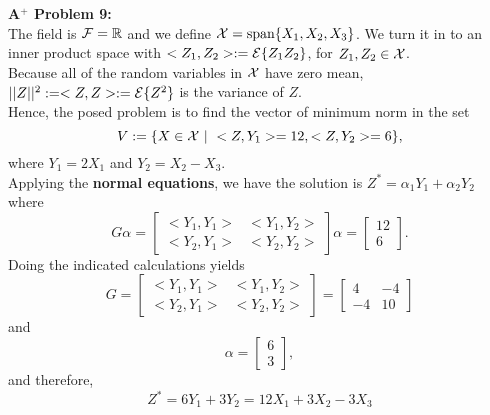 \documentclass[letterpaper]{article}
\begin{document}
\newpage
\noindent \textbf{A$^+$ Problem 9:} \\

The field is ${\cal F}=\mathbb R$ and we define ${\cal X}=\textrm{span} \{ X_1,X_2,X_3 \}$. We turn it in to an inner product space with $<Z_1,Z_2>:={\cal E}\{Z_1Z_2\}$, for $Z_1, Z_2 \in {\cal X}$.\\

Because all of the random variables in ${\cal X}$ have zero mean, $||Z||^2:=<Z, Z>:={\cal E}\{Z^2\}$ is the variance of $Z$. \\

Hence, the posed problem is to find the vector of minimum norm in the set $$V:=\{X\in {\cal X}~|~ <Z,Y_1> = 12, <Z,Y_2> = 6 \},$$
 where $Y_1=2X_1$ and $Y_2=X_2-X_3$.\\

 Applying the \textbf{normal equations}, we have the solution is $Z^*=\alpha_1 Y_1 + \alpha_2 Y_2$ where
 $$G \alpha = \left[ \begin{array}{cc} <Y_1,Y_1> &  <Y_1,Y_2> \\ <Y_2,Y_1> & <Y_2,Y_2> \end{array} \right] \alpha = \left[ \begin{array}{c} 12\\ 6 \end{array} \right].$$
 Doing the indicated calculations yields
 $$G=\left[ \begin{array}{cc} <Y_1,Y_1> &  <Y_1,Y_2> \\ <Y_2,Y_1> & <Y_2,Y_2> \end{array} \right] = \left[ \begin{array}{rr} 4&  -4 \\ -4 & 10 \end{array} \right]$$
 and
  $$\alpha = \left[ \begin{array}{r} 6 \\3\end{array} \right],$$
  and therefore,
  $$Z^*=  6 Y_1 +3 Y_2 = 12 X_1 +3 X_2 -3 X_3$$
\end{document}
